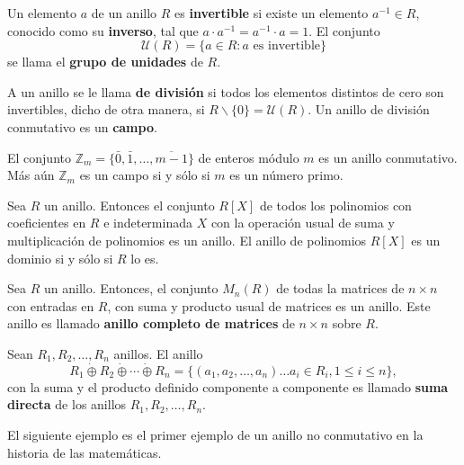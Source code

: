 \begin{definicion}
Un elemento $a$ de un anillo $R$ es \textbf{invertible} si existe un elemento $a^{-1} \in R$, conocido como su \textbf{inverso}, tal que $a\cdot a^{-1} = a^{-1} \cdot a = 1$. El conjunto \[ \mathcal{U}(R) = \{a \in R \colon a \mbox{ es invertible} \} \] se llama el \textbf{grupo de unidades} de $R$.
\end{definicion}
A un anillo se le llama \textbf{de división} si todos los elementos distintos de cero son invertibles, dicho de otra manera, si $R\backslash \{0\} = \mathcal{U}(R)$. Un anillo de división conmutativo es un \textbf{campo}.
\begin{ejemplo}
El conjunto $\mathds{Z}_m = \{ \bar{0}, \bar{1}, \dots, \overline{m-1} \}$ de enteros módulo $m$ es un anillo conmutativo. Más aún $\mathds{Z}_m$ es un campo si y sólo si $m$ es un número primo.
\end{ejemplo}
\begin{ejemplo}
Sea $R$ un anillo. Entonces el conjunto $R[X]$ de todos los polinomios con coeficientes en $R$ e indeterminada  $X$ con la operación usual de suma y multiplicación de polinomios es un anillo. El anillo de polinomios $R[X]$ es un dominio si y sólo si $R$ lo es. 
\end{ejemplo}
\begin{ejemplo}
Sea $R$ un anillo. Entonces, el conjunto $M_n(R)$ de todas la matrices de $n\times n$ con entradas en $R$, con suma y producto usual de matrices es un anillo. Este anillo es llamado \textbf{anillo completo de matrices} de $n\times n$ sobre $R$.
\end{ejemplo}
\begin{ejemplo}
Sean $R_1, R_2, \dots, R_n$ anillos. El anillo \[ R_1\dot{\oplus}R_2\dot{\oplus}\cdots\dot{\oplus} R_n = \{ (a_1,a_2,\dots,a_n) \dots a_i \in R_i, 1\leq i \leq n \},  \] con la suma y el producto definido componente a componente es llamado  \textbf{suma directa} de los anillos $R_1, R_2,\dots,R_n$.
\end{ejemplo}
El siguiente ejemplo es el primer ejemplo de un anillo no conmutativo en la historia de las matemáticas. 
